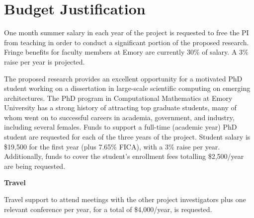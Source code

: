 
\section*{Budget Justification }




One month summer salary in each year of the project
is requested to free
the PI from teaching in order to conduct a significant portion of
the proposed research. Fringe benefits for faculty members at Emory
are currently 30\% of salary. A 3\% raise per year is projected.

The proposed research provides an excellent opportunity 
for a motivated PhD student working on a dissertation in
large-scale scientific computing on emerging architectures. 
The PhD program in Computational 
Mathematics at Emory University has a strong history of attracting
top graduate students, many of whom went on to successful careers
in academia, government, and industry, including several females.
Funds to support a full-time (academic year) PhD student 
are requested for each of the three years of the project.
Student salary is \$19,500 for the first year (plus 
7.65\% FICA), with a 3\% raise per year.
Additionally, funds to cover the student's 
enrollment fees 
totalling \$2,500/year are being requested.

\medskip
\par\noindent
{\bf Travel} 

Travel support to attend meetings with the other project
investigators plus one relevant conference per year,
for a total of \$4,000/year, is requested.


    

